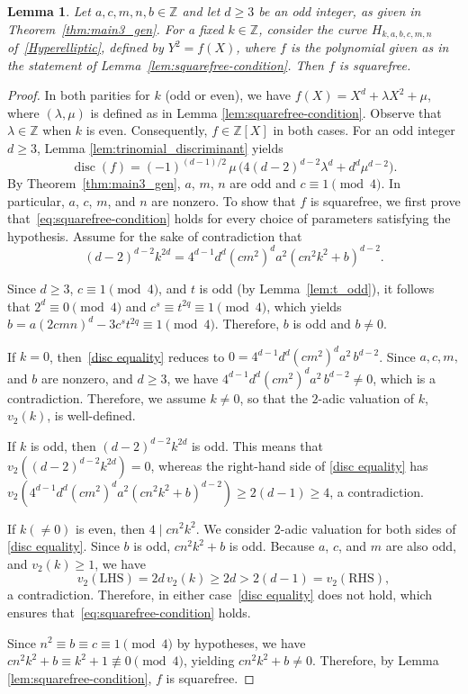 \documentclass[11pt,a4paper]{amsart}
\newcommand{\ZZ}{\mathbb{Z}}
\theoremstyle{plain}
\newtheorem{lemma}[theorem]{Lemma}
\theoremstyle{definition}
\DeclareMathOperator{\disc}{disc}
\begin{document}
\begin{lemma}\label{lem:squarefree}
Let $a, c, m, n, b \in \ZZ$ and let $d \ge 3$ be an odd integer, as given in Theorem~\ref{thm:main3_gen}. For a fixed $k \in \ZZ$, consider the curve $H_{k,a,b,c,m,n}$ of~\eqref{Hyperelliptic}, defined by $Y^2 = f(X)$, where $f $ is the polynomial given as in the statement of Lemma~\ref{lem:squarefree-condition}. Then $f$ is squarefree.
\end{lemma}
\begin{proof}
In both parities for $k$ (odd or even), we have $f(X)=X^d+\lambda X^2+\mu$, where $(\lambda,\mu)$ is defined as in Lemma \ref{lem:squarefree-condition}. Observe that $\lambda \in \ZZ$ when $k$ is even. Consequently, $ f \in\ZZ[X]$ in both cases. For an odd integer $d\ge 3$, Lemma \ref{lem:trinomial_discriminant} yields
\begin{equation}
\disc(f)=(-1)^{(d-1)/2}\,\mu\,\bigl(4(d-2)^{d-2}\lambda^{d}+d^{d}\mu^{d-2}\bigr).
\end{equation}
By Theorem~\ref{thm:main3_gen}, $a$, $m$, $n$ are odd and $c\equiv1\pmod{4}$. In particular, $a$, $c$, $m$, and $n$ are nonzero. To show that $f$ is squarefree, we first prove that~\eqref{eq:squarefree-condition} holds for every choice of parameters satisfying the hypothesis. Assume for the sake of contradiction that
\begin{equation}\label{disc equality}
(d-2)^{d-2} k^{2d} = 4^{d-1} d^d (cm^2)^d a^2 (cn^2k^2+b)^{d-2}.
\end{equation}

Since $d \ge 3$, $c \equiv 1 \pmod 4$, and $t$ is odd (by Lemma~\ref{lem:t_odd}), it follows that $2^d \equiv 0 \pmod 4$ and $c^s \equiv t^{2q} \equiv 1 \pmod 4$, which yields $ b= a(2cmn)^d - 3c^s t^{2q} \equiv1\pmod{4}$. Therefore, $b$ is odd and $b\neq 0$. 


If $k=0$, then~\eqref{disc equality} reduces to $0 = 4^{d-1} d^d (cm^2)^d a^2\, b^{d-2}$. Since $a, c, m,$ and $b$ are nonzero, and $d \ge 3$, we have $4^{d-1} d^d (cm^2)^d a^2\, b^{d-2}\neq 0$, which is a contradiction. Therefore, we assume $k\neq0$, so that the $2$-adic valuation of $k$, $v_2(k)$, is well-defined.


If $k$ is odd, then $(d-2)^{d-2}k^{2d}$ is odd. This means that $v_2((d-2)^{d-2}k^{2d})=0$, whereas the right-hand side of \eqref{disc equality} has $v_2(4^{d-1} d^d (cm^2)^d a^2 (cn^2k^2+b)^{d-2})\ge 2(d-1)\ge 4$, a contradiction.

If $k(\neq 0)$ is even, then $4\mid cn^2k^2$. We consider $2$-adic valuation for both sides of \eqref{disc equality}. Since $b$ is odd, $cn^2k^2+b$ is odd. Because $a$, $c$, and $m$ are also odd, and $v_2(k)\ge 1$, we have
\[
v_2(\mathrm{LHS})=2d\,v_2(k)\ge 2d >2(d-1)=v_2(\mathrm{RHS}),
\]
a contradiction. Therefore, in either case~\eqref{disc equality} does not hold, which ensures that~\eqref{eq:squarefree-condition} holds.

Since $n^2\equiv b\equiv c\equiv 1 \pmod{4}$ by hypotheses, we have $cn^2k^2 + b \equiv k^2+1 \not \equiv 0 \pmod 4$, yielding $cn^2k^2 + b \neq 0$. Therefore, by Lemma \ref{lem:squarefree-condition}, $f$ is squarefree.
\end{proof}
\end{document}
